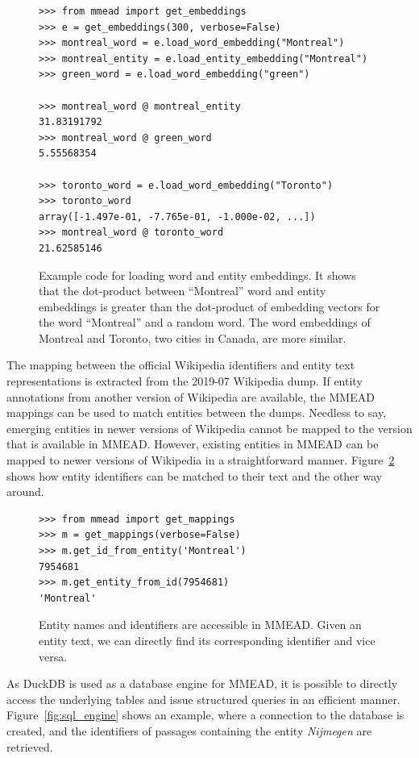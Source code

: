 \begin{figure}
	\begin{verbatim}
>>> from mmead import get_embeddings
>>> e = get_embeddings(300, verbose=False)
>>> montreal_word = e.load_word_embedding("Montreal")
>>> montreal_entity = e.load_entity_embedding("Montreal")
>>> green_word = e.load_word_embedding("green")

>>> montreal_word @ montreal_entity
31.83191792
>>> montreal_word @ green_word
5.55568354

>>> toronto_word = e.load_word_embedding("Toronto")
>>> toronto_word
array([-1.497e-01, -7.765e-01, -1.000e-02, ...])
>>> montreal_word @ toronto_word
21.62585146
	\end{verbatim}
	\caption{Example code for loading word and entity embeddings. It shows that the dot-product between ``Montreal'' word and entity embeddings is greater than the dot-product of embedding vectors for the word ``Montreal'' and a random word. The word embeddings of Montreal and Toronto, two cities in Canada, are more similar.}
	\label{fig:dot-product}
\end{figure}

The mapping between the official Wikipedia identifiers and entity text representations is extracted from the 2019-07 Wikipedia dump. If entity annotations from another version of Wikipedia are available, the MMEAD mappings can be used to match entities between the dumps. 
Needless to say, emerging entities in newer versions of Wikipedia cannot be mapped to the version that is available in MMEAD. However, existing entities in MMEAD can be mapped to newer versions of Wikipedia in a straightforward manner.
Figure~\ref{fig:load_mappings} shows how entity identifiers can be matched to their text and the other way around.  

\begin{figure}
	\begin{verbatim}
>>> from mmead import get_mappings
>>> m = get_mappings(verbose=False)
>>> m.get_id_from_entity('Montreal')
7954681
>>> m.get_entity_from_id(7954681)
'Montreal'
	\end{verbatim}
	\caption{Entity names and identifiers are accessible in MMEAD. Given an entity text, we can directly find its corresponding identifier and vice versa.}
	\label{fig:load_mappings}
\end{figure}

As DuckDB is used as a database engine for MMEAD, it is possible to directly access the underlying tables and issue structured queries in an efficient manner. Figure~\ref{fig:sql_engine} shows an example, where a connection to the database is created, and the identifiers of passages containing the entity \emph{Nijmegen} are retrieved.


